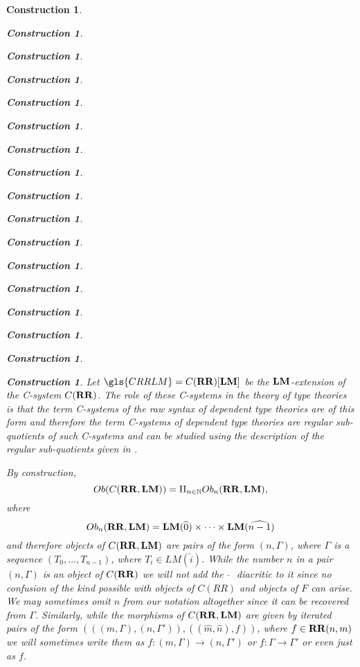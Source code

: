 \documentclass[onecolumn,12pt]{amsart}
\numberwithin{proposition}{subsection}
\newtheorem{construction}[proposition]{Construction}
\newcommand{\sr}{\rightarrow}
\newcommand{\nn}{{\mathbb N}}
\newcommand{\nat}{\nn}
\newcommand{\wh}{\widehat}
\newcommand{\RR}{{\bf RR}}
\newcommand{\LM}{{\bf LM}}
\begin{document}
\begin{construction}
\begin{construction}
\begin{construction}
\begin{construction}
\begin{construction}
\begin{construction}
\begin{construction}
\begin{construction}
\begin{construction}
\begin{construction}
\begin{construction}
\begin{construction}
\begin{construction}
\begin{construction}
\begin{construction}
\begin{construction}
\begin{construction}
Let $\gls{CRRLM}=C(\RR)[\LM]$ be the $\LM$-extension of the C-system
$C(\RR)$. The role of these C-systems in the theory of type theories is that
the term C-systems of the raw syntax of dependent type theories are of this
form and therefore the term C-systems of dependent type theories are regular
sub-quotients of such C-systems and can be studied using the description of the
regular sub-quotients given in \cite{Csubsystems}.

By construction,
%
\begin{equation}\label{2016.01.21.eq3}
Ob(C(\RR,\LM))=\amalg_{n\in\nat}Ob_n(\RR,\LM),
\end{equation}%
%
where 
%
$$Ob_n(\RR,\LM)=\LM(\wh{0})\times\dots\times\LM(\wh{n-1})$$
%
and therefore objects of $C(\RR,\LM)$ are pairs of the form $(n,\Gamma)$, where
$\Gamma$ is a sequence $(T_0,\dots,T_{n-1})$, where $T_i\in LM(\wh{i})$. While
the number $n$ in a pair $(n,\Gamma)$ is an object of $C(\RR)$ we will not add
the ${\,\,\wh{}\,\,}$ diacritic to it since no confusion of the kind possible
with objects of $C(RR)$ and objects of $F$ can arise. We may sometimes omit $n$
from our notation altogether since it can be recovered from
$\Gamma$. Similarly, while the morphisms of $C(\RR,\LM)$ are given by iterated
pairs of the form $(((m,\Gamma),(n,\Gamma')),((\wh{m},\wh{n}),f))$, where $f\in
\RR(n,m)$ we will sometimes write them as $f:(m,\Gamma)\sr (n,\Gamma')$ or
$f:\Gamma\sr \Gamma'$ or even just as $f$.


\end{construction}
\end{construction}
\end{construction}
\end{construction}
\end{construction}
\end{construction}
\end{construction}
\end{construction}
\end{construction}
\end{construction}
\end{construction}
\end{construction}
\end{construction}
\end{construction}
\end{construction}
\end{construction}
\end{construction}
\end{document}
